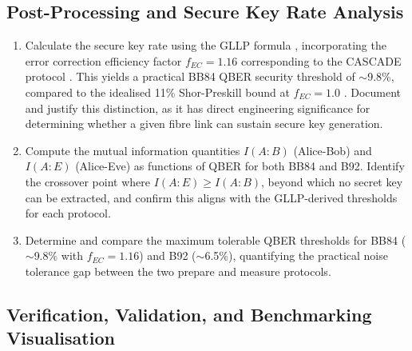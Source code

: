 \documentclass[10pt, a4paper]{report}
\begin{document}
\subsection{Post-Processing and Secure Key Rate Analysis}

\begin{enumerate}[label=\textbf{O4.\arabic*}, leftmargin=1.5cm]
    \item Calculate the secure key rate using the GLLP formula \cite{GLLP2004}, incorporating the error correction efficiency factor $f_{EC} = 1.16$ corresponding to the CASCADE protocol \cite{Cascade1994}. This yields a practical BB84 QBER security threshold of $\sim$9.8\%, compared to the idealised 11\% Shor-Preskill bound at $f_{EC} = 1.0$ \cite{ShorPreskill2000}. Document and justify this distinction, as it has direct engineering significance for determining whether a given fibre link can sustain secure key generation.

    \item Compute the mutual information quantities $I(A{:}B)$ (Alice-Bob) and $I(A{:}E)$ (Alice-Eve) as functions of QBER for both BB84 and B92. Identify the crossover point where $I(A{:}E) \geq I(A{:}B)$, beyond which no secret key can be extracted, and confirm this aligns with the GLLP-derived thresholds for each protocol.

    \item Determine and compare the maximum tolerable QBER thresholds for BB84 ($\sim$9.8\% with $f_{EC} = 1.16$) and B92 ($\sim$6.5\%), quantifying the practical noise tolerance gap between the two prepare and measure protocols.
\end{enumerate}

\subsection{Verification, Validation, and Benchmarking Visualisation}
\end{document}
